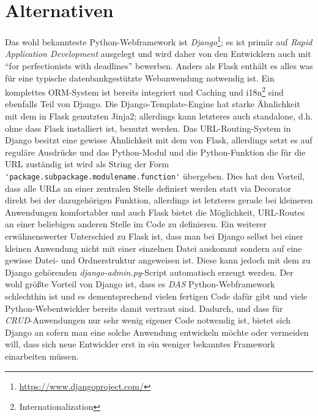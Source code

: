\section{Alternativen}
Das wohl bekannteste Python-Webframework ist
\emph{Django}\footnote{\href{https://www.djangoproject.com/}{https://www.djangoproject.com/}}; es
ist primär auf \emph{Rapid Application Development} ausgelegt und wird daher von den Entwicklern
auch mit \enquote{for perfectionists with deadlines} bewerben. Anders als Flask enthält es alles was
für eine typische datenbankgestützte Webanwendung notwendig ist. Ein komplettes ORM-System ist
bereits integriert und Caching und i18n\footnote{Internationalization} sind ebenfalls Teil von
Django. Die Django-Template-Engine hat starke Ähnlichkeit mit dem in Flask genutzten Jinja2;
allerdings kann letzteres auch standalone, d.h. ohne dass Flask installiert ist, benutzt werden. Das
URL-Routing-System in Django besitzt eine gewisse Ähnlichkeit mit dem von Flask, allerdings setzt es
auf reguläre Ausdrücke und das Python-Modul und die Python-Funktion die für die URL zuständig ist
wird als String der Form \lstinline{'package.subpackage.modulename.function'} übergeben. Dies hat
den Vorteil, dass alle URLs an einer zentralen Stelle definiert werden statt via Decorator direkt
bei der dazugehörigen Funktion, allerdings ist letzteres gerade bei kleineren Anwendungen
komfortabler und auch Flask bietet die Möglichkeit, URL-Routes an einer beliebigen anderen Stelle im
Code zu definieren. Ein weiterer erwähnenswerter Unterschied zu Flask ist, dass man bei Django
selbst bei einer kleinen Anwendung nicht mit einer einzelnen Datei auskommt sondern auf eine gewisse
Datei- und Ordnerstruktur angeweisen ist. Diese kann jedoch mit dem zu Django gehörenden
\emph{django-admin.py}-Script automatisch erzeugt werden. Der wohl größte Vorteil von Django ist,
dass es \emph{DAS} Python-Webframework schlechthin ist und es dementsprechend vielen fertigen Code
dafür gibt und viele Python-Webentwickler bereits damit vertraut sind. Dadurch, und dass für
\emph{CRUD}-Anwendungen nur sehr wenig eigener Code notwendig ist, bietet sich Django an sofern man
eine solche Anwendung entwickeln möchte oder vermeiden will, dass sich neue Entwickler erst in ein
weniger bekanntes Framework einarbeiten müssen.

